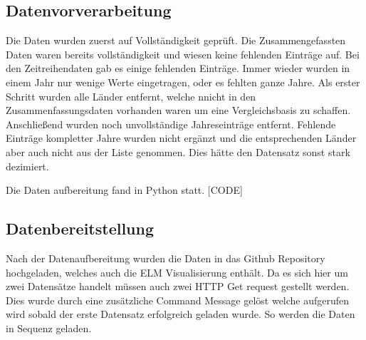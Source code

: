 \subsection{Datenvorverarbeitung}

Die Daten wurden zuerst auf Vollständigkeit geprüft. Die Zusammengefassten Daten waren bereits vollständigkeit und wiesen keine fehlenden Einträge auf. Bei den Zeitreihendaten gab es einige fehlenden Einträge. Immer wieder wurden in einem Jahr nur wenige Werte eingetragen, oder es fehlten ganze Jahre. Als erster Schritt wurden alle Länder entfernt, welche nnicht in den Zusammenfassungsdaten vorhanden waren um eine Vergleichsbasis zu schaffen. Anschließend wurden noch unvollständige Jahreseinträge entfernt. Fehlende Einträge kompletter Jahre wurden nicht ergänzt und die entsprechenden Länder aber auch nicht aus der Liste genommen. Dies hätte den Datensatz sonst stark dezimiert. 

Die Daten aufbereitung fand in Python statt. 
[CODE]

\subsection{Datenbereitstellung}

Nach der Datenaufbereitung wurden die Daten in das Github Repository hochgeladen, welches auch die ELM Visualisierung enthält. Da es sich hier um zwei Datensätze handelt müssen auch zwei HTTP Get request gestellt werden. Dies wurde durch eine zusätzliche Command Message gelöst welche aufgerufen wird sobald der erste Datensatz erfolgreich geladen wurde. So werden die Daten in Sequenz geladen. 